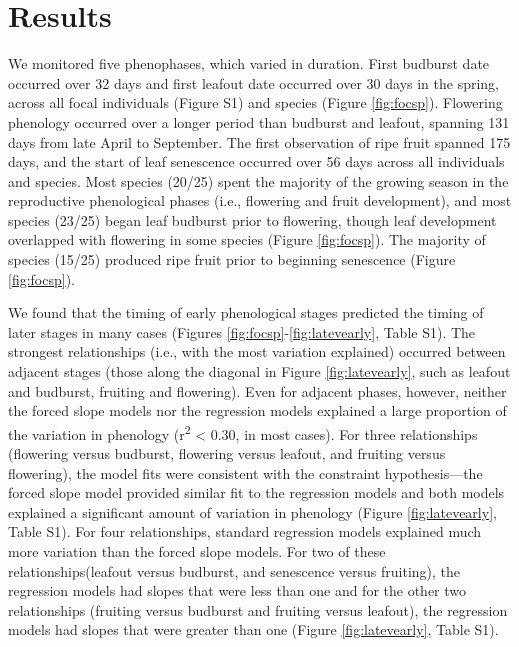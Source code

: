 \documentclass{article}
\begin{document}
\section* {Results}
\par We monitored five phenophases, which varied in duration. First budburst date occurred over 32 days and first leafout date occurred over 30 days in the spring, across all focal individuals (Figure S1) and species (Figure \ref{fig:focsp}). Flowering phenology occurred over a longer period than budburst and leafout, spanning 131 days from late April to September. The first observation of ripe fruit spanned 175 days, and the start of leaf senescence occurred over 56 days across all individuals and species. Most species (20/25) spent the majority of the growing season in the reproductive phenological phases (i.e., flowering and fruit development), and most species (23/25) began leaf budburst prior to flowering, though leaf development overlapped with flowering in some species (Figure \ref{fig:focsp}). The majority of species (15/25) produced ripe fruit prior to beginning senescence (Figure \ref{fig:focsp}).

\par We found that the timing of early phenological stages predicted the timing of later stages in many cases (Figures \ref{fig:focsp}-\ref{fig:latevearly}, Table S1). The strongest relationships (i.e., with the most variation explained) occurred between adjacent stages (those along the diagonal in Figure \ref{fig:latevearly}, such as leafout and budburst, fruiting and flowering). Even for adjacent phases, however, neither the forced slope models nor the regression models explained a large proportion of the variation in phenology (r\textsuperscript{2} < 0.30, in most cases). For three relationships (flowering versus budburst, flowering versus leafout, and fruiting versus flowering), the model fits were consistent with the constraint hypothesis---the forced slope model provided similar fit to the regression models and both models explained a significant amount of variation in phenology (Figure \ref{fig:latevearly}, Table S1). For four relationships, standard regression models explained much more variation than the forced slope models.   For two of these relationships(leafout versus budburst, and senescence versus fruiting), the regression models had slopes that were less than one and for the other two relationships (fruiting versus budburst and fruiting versus leafout), the regression models had slopes that were greater than one (Figure \ref{fig:latevearly}, Table S1).
\end{document}

